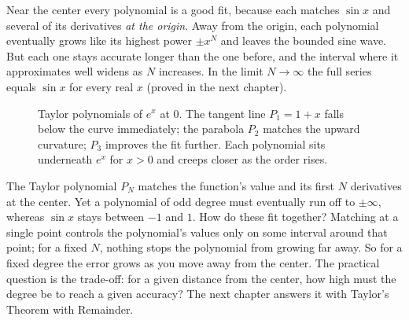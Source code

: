 Near the center every polynomial is a good fit, because each matches $\sin x$ and several of its derivatives \emph{at the origin}. Away from the origin, each polynomial eventually grows like its highest power $\pm x^{N}$ and leaves the bounded sine wave. But each one stays accurate longer than the one before, and the interval where it approximates well widens as $N$ increases. In the limit $N\to\infty$ the full series equals $\sin x$ for every real $x$ (proved in the next chapter).

\begin{figure}[H]
\centering
{}
\caption{Taylor polynomials of $e^x$ at $0$. The tangent line $P_1=1+x$ falls below the curve immediately; the parabola $P_2$ matches the upward curvature; $P_3$ improves the fit further. Each polynomial sits underneath $e^x$ for $x>0$ and creeps closer as the order rises.}
\label{ch30:fig-exp-taylor}
\end{figure}

\begin{walkbox}
The Taylor polynomial $P_N$ matches the function's value and its first $N$ derivatives at the center. Yet a polynomial of odd degree must eventually run off to $\pm\infty$, whereas $\sin x$ stays between $-1$ and $1$. How do these fit together? Matching at a single point controls the polynomial's values only on some interval around that point; for a fixed $N$, nothing stops the polynomial from growing far away. So for a fixed degree the error grows as you move away from the center. The practical question is the trade-off: for a given distance from the center, how high must the degree be to reach a given accuracy? The next chapter answers it with Taylor's Theorem with Remainder.
\end{walkbox}

